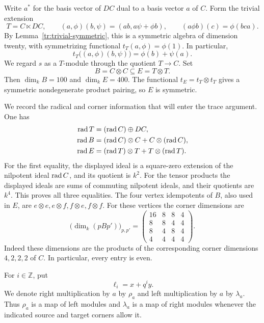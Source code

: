 Write \(a^*\) for the basis vector of \(DC\) dual to a basis vector
\(a\) of \(C\).  Form the trivial extension
\begin{equation}
T=C\ltimes DC,\qquad
(a,\phi)(b,\psi)=(ab,a\psi+\phi b),\qquad
(a\phi b)(c)=\phi(bca).
\label{a:trivial-extension}
\end{equation}
By Lemma~\ref{tr:trivial-symmetric}, this is a symmetric algebra of
dimension twenty, with symmetrizing functional
\(t_T(a,\phi)=\phi(1)\).  In particular,
\[
t_T\bigl((a,\phi)(b,\psi)\bigr)=\phi(b)+\psi(a).
\]
We regard \(s\) as a \(T\)-module through the quotient \(T\to C\).
Set
\begin{equation}
B=C\otimes C\subseteq E=T\otimes T.
\label{a:tensor-algebras}
\end{equation}
Then \(\dim_k B=100\) and \(\dim_k E=400\).  The functional
\(t_E=t_T\otimes t_T\) gives a symmetric nondegenerate product pairing,
so \(E\) is symmetric.

We record the radical and corner information that will enter the trace
argument.  One has
\begin{align}
\operatorname{rad} T&=(\operatorname{rad} C)\oplus DC,\nonumber\\
\operatorname{rad} B&=(\operatorname{rad} C)\otimes C+C\otimes(\operatorname{rad} C),\nonumber\\
\operatorname{rad} E&=(\operatorname{rad} T)\otimes T+T\otimes(\operatorname{rad} T).
\label{a:radicals}
\end{align}
For the first equality, the displayed ideal is a square-zero extension
of the nilpotent ideal \(\operatorname{rad} C\), and its quotient is \(k^2\).
For the tensor products the displayed ideals are sums of commuting
nilpotent ideals, and their quotients are \(k^4\).  This proves all
three equalities.  The four vertex idempotents of \(B\), also used in
\(E\), are \(e\otimes e,e\otimes f,f\otimes e,f\otimes f\).
For these vertices the corner dimensions are
\begin{equation}
\bigl(\dim_k(pB p')\bigr)_{p,p'}=
\begin{pmatrix}
16&8&8&4\\
8&8&4&4\\
8&4&8&4\\
4&4&4&4
\end{pmatrix}.
\label{a:corner-parity}
\end{equation}
Indeed these dimensions are the products of the corresponding corner
dimensions \(4,2,2,2\) of \(C\).  In particular, every entry is even.

For \(i\in\mathbb Z\), put
\[
\ell_i=x+q^i y.
\]
We denote right multiplication by \(a\) by \(\rho_a\) and left
multiplication by \(a\) by \(\lambda_a\).  Thus \(\rho_a\) is a map
of left modules and \(\lambda_a\) is a map of right modules whenever
the indicated source and target corners allow it.

